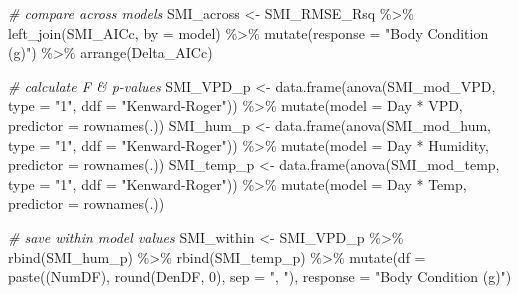 \documentclass[
]{article}
\newenvironment{Shaded}{\begin{snugshade}}{\end{snugshade}}
\newcommand{\AttributeTok}[1]{\textcolor[rgb]{0.77,0.63,0.00}{#1}}
\newcommand{\CommentTok}[1]{\textcolor[rgb]{0.56,0.35,0.01}{\textit{#1}}}
\newcommand{\DecValTok}[1]{\textcolor[rgb]{0.00,0.00,0.81}{#1}}
\newcommand{\FunctionTok}[1]{\textcolor[rgb]{0.00,0.00,0.00}{#1}}
\newcommand{\NormalTok}[1]{#1}
\newcommand{\OtherTok}[1]{\textcolor[rgb]{0.56,0.35,0.01}{#1}}
\newcommand{\SpecialCharTok}[1]{\textcolor[rgb]{0.00,0.00,0.00}{#1}}
\newcommand{\StringTok}[1]{\textcolor[rgb]{0.31,0.60,0.02}{#1}}
\begin{document}
\begin{Shaded}
\begin{Highlighting}[]
\CommentTok{\# compare across models}
\NormalTok{SMI\_across }\OtherTok{\textless{}{-}}\NormalTok{ SMI\_RMSE\_Rsq }\SpecialCharTok{\%\textgreater{}\%}
  \FunctionTok{left\_join}\NormalTok{(SMI\_AICc, }\AttributeTok{by =} \StringTok{\textquotesingle{}model\textquotesingle{}}\NormalTok{) }\SpecialCharTok{\%\textgreater{}\%}
  \FunctionTok{mutate}\NormalTok{(}\AttributeTok{response =} \StringTok{"Body Condition (g\textquotesingle{})"}\NormalTok{) }\SpecialCharTok{\%\textgreater{}\%}
  \FunctionTok{arrange}\NormalTok{(Delta\_AICc)}

\CommentTok{\# calculate F \& p{-}values}
\NormalTok{SMI\_VPD\_p }\OtherTok{\textless{}{-}} \FunctionTok{data.frame}\NormalTok{(}\FunctionTok{anova}\NormalTok{(SMI\_mod\_VPD, }
                              \AttributeTok{type =} \StringTok{"1"}\NormalTok{, }
                              \AttributeTok{ddf =} \StringTok{"Kenward{-}Roger"}\NormalTok{)) }\SpecialCharTok{\%\textgreater{}\%}
  \FunctionTok{mutate}\NormalTok{(}\AttributeTok{model =} \StringTok{\textquotesingle{}Day * VPD\textquotesingle{}}\NormalTok{,}
         \AttributeTok{predictor =} \FunctionTok{rownames}\NormalTok{(.))}
\NormalTok{SMI\_hum\_p }\OtherTok{\textless{}{-}} \FunctionTok{data.frame}\NormalTok{(}\FunctionTok{anova}\NormalTok{(SMI\_mod\_hum, }
                              \AttributeTok{type =} \StringTok{"1"}\NormalTok{, }
                              \AttributeTok{ddf =} \StringTok{"Kenward{-}Roger"}\NormalTok{)) }\SpecialCharTok{\%\textgreater{}\%}
  \FunctionTok{mutate}\NormalTok{(}\AttributeTok{model =} \StringTok{\textquotesingle{}Day * Humidity\textquotesingle{}}\NormalTok{,}
         \AttributeTok{predictor =} \FunctionTok{rownames}\NormalTok{(.))}
\NormalTok{SMI\_temp\_p }\OtherTok{\textless{}{-}} \FunctionTok{data.frame}\NormalTok{(}\FunctionTok{anova}\NormalTok{(SMI\_mod\_temp, }
                              \AttributeTok{type =} \StringTok{"1"}\NormalTok{, }
                              \AttributeTok{ddf =} \StringTok{"Kenward{-}Roger"}\NormalTok{)) }\SpecialCharTok{\%\textgreater{}\%}
  \FunctionTok{mutate}\NormalTok{(}\AttributeTok{model =} \StringTok{\textquotesingle{}Day * Temp\textquotesingle{}}\NormalTok{,}
         \AttributeTok{predictor =} \FunctionTok{rownames}\NormalTok{(.))}

\CommentTok{\# save within model values}
\NormalTok{SMI\_within }\OtherTok{\textless{}{-}}\NormalTok{ SMI\_VPD\_p }\SpecialCharTok{\%\textgreater{}\%}
  \FunctionTok{rbind}\NormalTok{(SMI\_hum\_p) }\SpecialCharTok{\%\textgreater{}\%}
  \FunctionTok{rbind}\NormalTok{(SMI\_temp\_p) }\SpecialCharTok{\%\textgreater{}\%}
  \FunctionTok{mutate}\NormalTok{(}\AttributeTok{df =} \FunctionTok{paste}\NormalTok{((NumDF), }\FunctionTok{round}\NormalTok{(DenDF, }\DecValTok{0}\NormalTok{), }\AttributeTok{sep =} \StringTok{", "}\NormalTok{),}
         \AttributeTok{response =} \StringTok{"Body Condition (g\textquotesingle{})"}\NormalTok{)}
\end{Highlighting}
\end{Shaded}
\end{document}
